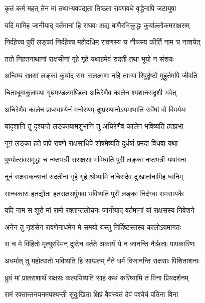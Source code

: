 \twolineshloka
{कृतं कर्म महत् तेन मां तथाभ्यवपद्यता}
{तिष्ठता रावणवधे वृद्धेनापि जटायुषा} %

\twolineshloka
{यदि मामिह जानीयाद् वर्तमानां हि राघवः}
{अद्य बाणैरभिक्रुद्धः कुर्याल्लोकमराक्षसम्} %

\twolineshloka
{निर्दहेच्च पुरीं लङ्कां निर्दहेच्च महोदधिम्}
{रावणस्य च नीचस्य कीर्तिं नाम च नाशयेत्} %

\twolineshloka
{ततो निहतनाथानां राक्षसीनां गृहे गृहे}
{यथाहमेवं रुदती तथा भूयो न संशयः} %

\twolineshloka
{अन्विष्य रक्षसां लङ्कां कुर्याद् रामः सलक्ष्मणः}
{नहि ताभ्यां रिपुर्दृष्टो मुहूर्तमपि जीवति} %

\twolineshloka
{चिताधूमाकुलपथा गृध्रमण्डलमण्डिता}
{अचिरेणैव कालेन श्मशानसदृशी भवेत्} %

\twolineshloka
{अचिरेणैव कालेन प्राप्स्याम्येनं मनोरथम्}
{दुष्प्रस्थानोऽयमाभाति सर्वेषां वो विपर्ययः} %

\twolineshloka
{यादृशानि तु दृश्यन्ते लङ्कायामशुभानि तु}
{अचिरेणैव कालेन भविष्यति हतप्रभा} %

\twolineshloka
{नूनं लङ्का हते पापे रावणे राक्षसाधिपे}
{शोषमेष्यति दुर्धर्षा प्रमदा विधवा यथा} %

\twolineshloka
{पुण्योत्सवसमृद्धा च नष्टभर्त्री सराक्षसा}
{भविष्यति पुरी लङ्का नष्टभर्त्री यथांगना} %

\twolineshloka
{नूनं राक्षसकन्यानां रुदतीनां गृहे गृहे}
{श्रोष्यामि नचिरादेव दुःखार्तानामिह ध्वनिम्} %

\twolineshloka
{सान्धकारा हतद्योता हतराक्षसपुंगवा}
{भविष्यति पुरी लङ्का निर्दग्धा रामसायकैः} %

\twolineshloka
{यदि नाम स शूरो मां रामो रक्तान्तलोचनः}
{जानीयाद् वर्तमानां यां राक्षसस्य निवेशने} %

\twolineshloka
{अनेन तु नृशंसेन रावणेनाधमेन मे}
{समयो यस्तु निर्दिष्टस्तस्य कालोऽयमागतः} %

\twolineshloka
{स च मे विहितो मृत्युरस्मिन् दुष्टेन वर्तते}
{अकार्यं ये न जानन्ति नैर्ऋताः पापकारिणः} %

\twolineshloka
{अधर्मात् तु महोत्पातो भविष्यति हि साम्प्रतम्}
{नैते धर्मं विजानन्ति राक्षसाः पिशिताशनाः} %

\twolineshloka
{ध्रुवं मां प्रातराशार्थं राक्षसः कल्पयिष्यति}
{साहं कथं करिष्यामि तं विना प्रियदर्शनम्} %

\twolineshloka
{रामं रक्तान्तनयनमपश्यन्ती सुदुःखिता}
{क्षिप्रं वैवस्वतं देवं पश्येयं पतिना विना} %

